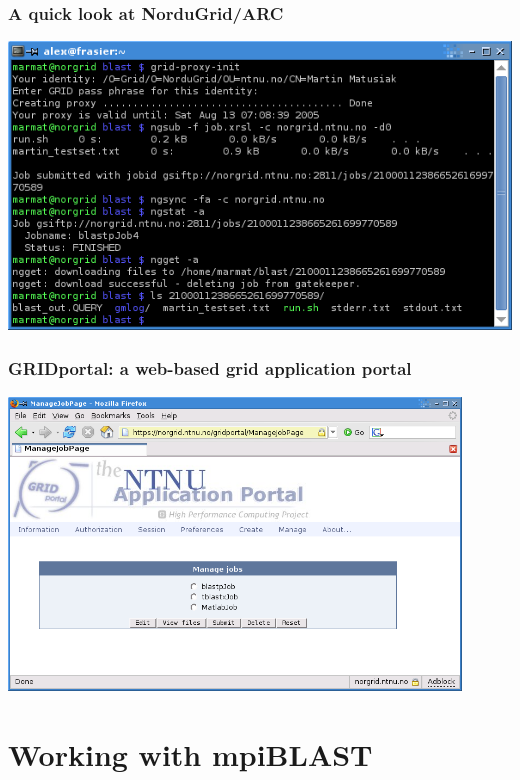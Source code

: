 \documentclass{beamer}
\begin{document}
\begin{frame}
  \frametitle{A quick look at NorduGrid/ARC}

	\includegraphics[width=\textwidth]{console_submit.png}
\end{frame}

\begin{frame}
  \frametitle{GRIDportal: a web-based grid application portal}

	\begin{center}
		\includegraphics[width=0.9\textwidth]{gridportal_managejobs.png}
	\end{center}
\end{frame}







\section{Working with mpiBLAST}
\end{document}
